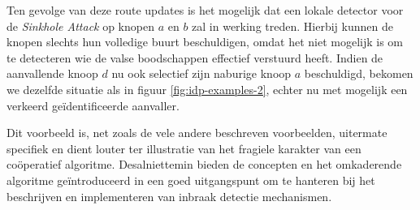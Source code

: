 Ten gevolge van deze route updates is het mogelijk dat een lokale detector voor
de \emph{Sinkhole Attack} op knopen $a$ en $b$ zal in werking treden. Hierbij
kunnen de knopen slechts hun volledige buurt beschuldigen, omdat het niet
mogelijk is om te detecteren wie de valse boodschappen effectief verstuurd
heeft. Indien de aanvallende knoop $d$ nu ook selectief zijn naburige knoop $a$
beschuldigd, bekomen we dezelfde situatie als in figuur
\ref{fig:idp-examples-2}, echter nu met mogelijk een verkeerd
ge\"identificeerde aanvaller.

Dit voorbeeld is, net zoals de vele andere beschreven voorbeelden, uitermate
specifiek en dient louter ter illustratie van het fragiele karakter van een
co\"operatief algoritme. Desalniettemin bieden de concepten en het omkaderende
algoritme ge\"introduceerd in \cite{krontiris2009cooperative} een goed
uitgangspunt om te hanteren bij het beschrijven en implementeren van inbraak
detectie mechanismen.

